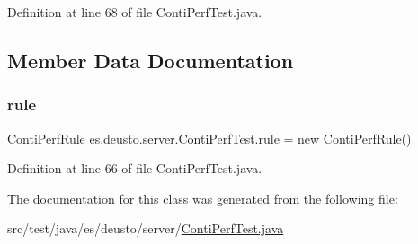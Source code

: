 Definition at line 68 of file Conti\+Perf\+Test.\+java.



\subsection{Member Data Documentation}
\mbox{\label{classes_1_1deusto_1_1server_1_1_conti_perf_test_a36643de9d25126a2f4d24e6b61987c31}} 
\subsubsection{\texorpdfstring{rule}{rule}}
{\footnotesize\ttfamily Conti\+Perf\+Rule es.\+deusto.\+server.\+Conti\+Perf\+Test.\+rule = new Conti\+Perf\+Rule()}



Definition at line 66 of file Conti\+Perf\+Test.\+java.



The documentation for this class was generated from the following file\+:\begin{DoxyCompactItemize}
\item 
src/test/java/es/deusto/server/\hyperlink{_conti_perf_test_8java}{Conti\+Perf\+Test.\+java}\end{DoxyCompactItemize}
